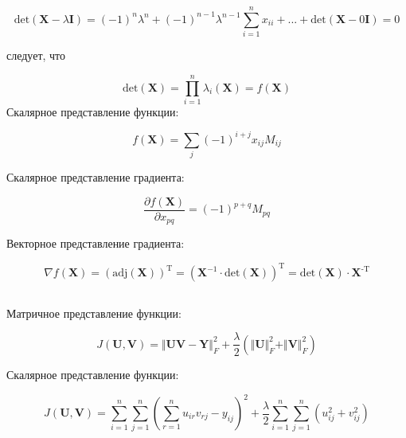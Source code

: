 	\begin{equation}
	\text{det}(\mathbf{X} - \lambda \mathbf{I}) = (-1)^n \lambda^n +(-1)^{n-1} \lambda^{n-1} \sum\limits_{i=1}^{n}x_{ii} + ... + \text{det} (\mathbf{X} - 0 \mathbf{I} )= 0
	\end{equation}
	
	следует, что 
	
	\begin{equation}
	\text{det} (\mathbf{X} )= \prod\limits_{i=1}^n \lambda_i  (\mathbf{X}) =
	f(\mathbf{X})
	\end{equation}
	Скалярное представление функции:
	
	\begin{equation}
	f(\mathbf{X}) = \sum_j (-1)^{i+j} x_{ij} M_{ij}
	\end{equation}
	
	Скалярное представление градиента:
	
	\begin{equation}
	\frac{\partial f(\mathbf{X}) }{\partial x_{pq}} = (-1)^{p+q}  M_{pq}
	\end{equation}
	
	Векторное представление градиента:
	
	\begin{equation}
	\nabla f(\mathbf{X})  = (\text{adj}(\mathbf{X}))^{\text{T}} =
	(\mathbf{X}^{-1}\cdot \text{det}(\mathbf{X}))^{\text{T}} =
	\text{det}(\mathbf{X}) \cdot\mathbf{X}^{\text{-T}}
	\end{equation}
	
	\subsection{}
	
	Матричное представление функции:
	
	\begin{equation}
	J(\mathbf{U}, \mathbf{V}) = \Vert \mathbf{U} \mathbf{V} - \mathbf{Y} \Vert_F^2
	+ \frac{\lambda}{2}(\Vert \mathbf{U} \Vert_F^2 + \Vert \mathbf{V}\Vert_F^2)
	\end{equation}
	
	Скалярное представление функции:
	
	\begin{equation}
	J(\mathbf{U}, \mathbf{V}) = \sum\limits_{i=1}^{n} \sum\limits_{j=1}^{n}
	(\sum\limits_{r=1}^{n}u_{ir}v_{rj}-y_{ij})^2 +
	\frac{\lambda}{2}\sum\limits_{i=1}^{n} \sum\limits_{j=1}^{n}(u_{ij}^2+v_{ij}^2)
	\end{equation}
	
